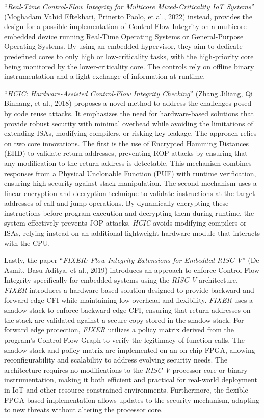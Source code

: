 ``\textit{Real-Time Control-Flow Integrity for Multicore Mixed-Criticality IoT
Systems}'' (Moghadam Vahid Eftekhari, Prinetto Paolo, et al., 2022)\cite{multicorecfi}
instead, provides the design for a possible implementation of Control Flow Integrity
on a multicore embedded device running Real-Time Operating Systems or General-Purpose
Operating Systems. By using an embedded hypervisor, they aim to dedicate predefined
cores to only high or low-criticality tasks, with the high-priority core being
monitored by the lower-criticality core. The controls rely on offline binary instrumentation
and a light exchange of information at runtime.

``\textit{HCIC: Hardware-Assisted Control-Flow Integrity Checking}'' (Zhang Jiliang,
Qi Binhang, et al., 2018)\cite{HCIC} proposes a novel method to address the challenges
posed by code reuse attacks. It emphasizes the need for hardware-based solutions
that provide robust security with minimal overhead while avoiding the
limitations of extending ISAs, modifying compilers, or risking key leakage. The approach
relies on two core innovations. The first is the use of Encrypted Hamming
Distances (EHD) to validate return addresses, preventing ROP attacks by ensuring
that any modification to the return address is detectable. This mechanism
combines responses from a Physical Unclonable Function (PUF) with runtime
verification, ensuring high security against stack manipulation. The second
mechanism uses a linear encryption and decryption technique to validate
instructions at the target addresses of call and jump operations. By dynamically
encrypting these instructions before program execution and decrypting them during
runtime, the system effectively prevents JOP attacks. \textit{HCIC} avoids
modifying compilers or ISAs, relying instead on an additional lightweight hardware
module that interacts with the CPU.

Lastly, the paper ``\textit{FIXER: Flow Integrity Extensions for Embedded RISC-V}''
(De Asmit, Basu Aditya, et al., 2019)\cite{Fixer} introduces an approach to
enforce Control Flow Integrity specifically for embedded systems using the
\textit{RISC-V} architecture. \textit{FIXER} introduces a hardware-based solution
designed to provide backward and forward edge CFI while maintaining low overhead
and flexibility. \textit{FIXER} uses a shadow stack to enforce backward edge CFI,
ensuring that return addresses on the stack are validated against a secure copy
stored in the shadow stack. For forward edge protection, \textit{FIXER} utilizes
a policy matrix derived from the program's Control Flow Graph to verify the legitimacy
of function calls. The shadow stack and policy matrix are implemented on an on-chip
FPGA, allowing reconfigurability and scalability to address evolving security needs.
The architecture requires no modifications to the \textit{RISC-V} processor core
or binary instrumentation, making it both efficient and practical for real-world
deployment in IoT and other resource-constrained environments. Furthermore, the
flexible FPGA-based implementation allows updates to the security mechanism, adapting
to new threats without altering the processor core.

